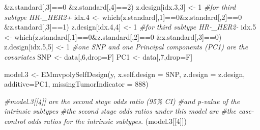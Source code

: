 \documentclass[11pt,]{article}
\newenvironment{Shaded}{\begin{snugshade}}{\end{snugshade}}
\newcommand{\AttributeTok}[1]{\textcolor[rgb]{0.77,0.63,0.00}{#1}}
\newcommand{\CommentTok}[1]{\textcolor[rgb]{0.56,0.35,0.01}{\textit{#1}}}
\newcommand{\DecValTok}[1]{\textcolor[rgb]{0.00,0.00,0.81}{#1}}
\newcommand{\FloatTok}[1]{\textcolor[rgb]{0.00,0.00,0.81}{#1}}
\newcommand{\FunctionTok}[1]{\textcolor[rgb]{0.00,0.00,0.00}{#1}}
\newcommand{\NormalTok}[1]{#1}
\newcommand{\OtherTok}[1]{\textcolor[rgb]{0.56,0.35,0.01}{#1}}
\newcommand{\SpecialCharTok}[1]{\textcolor[rgb]{0.00,0.00,0.00}{#1}}
\begin{document}
\begin{Shaded}
\begin{Highlighting}[]
               \SpecialCharTok{\&}\NormalTok{z.standard[,}\DecValTok{3}\NormalTok{]}\SpecialCharTok{==}\DecValTok{0}
               \SpecialCharTok{\&}\NormalTok{z.standard[,}\DecValTok{4}\NormalTok{]}\SpecialCharTok{==}\DecValTok{2}\NormalTok{)}
\NormalTok{z.design[idx}\FloatTok{.3}\NormalTok{,}\DecValTok{3}\NormalTok{] }\OtherTok{\textless{}{-}} \DecValTok{1}
\CommentTok{\#for third subtype HR{-}\_HER2+}
\NormalTok{idx}\FloatTok{.4} \OtherTok{\textless{}{-}} \FunctionTok{which}\NormalTok{(z.standard[,}\DecValTok{1}\NormalTok{]}\SpecialCharTok{==}\DecValTok{0}\SpecialCharTok{\&}\NormalTok{z.standard[,}\DecValTok{2}\NormalTok{]}\SpecialCharTok{==}\DecValTok{0}
               \SpecialCharTok{\&}\NormalTok{z.standard[,}\DecValTok{3}\NormalTok{]}\SpecialCharTok{==}\DecValTok{1}\NormalTok{)}
\NormalTok{z.design[idx}\FloatTok{.4}\NormalTok{,}\DecValTok{4}\NormalTok{] }\OtherTok{\textless{}{-}} \DecValTok{1}
\CommentTok{\#for third subtype HR{-}\_HER2{-}}
\NormalTok{idx}\FloatTok{.5} \OtherTok{\textless{}{-}} \FunctionTok{which}\NormalTok{(z.standard[,}\DecValTok{1}\NormalTok{]}\SpecialCharTok{==}\DecValTok{0}\SpecialCharTok{\&}\NormalTok{z.standard[,}\DecValTok{2}\NormalTok{]}\SpecialCharTok{==}\DecValTok{0}
               \SpecialCharTok{\&}\NormalTok{z.standard[,}\DecValTok{3}\NormalTok{]}\SpecialCharTok{==}\DecValTok{0}\NormalTok{)}
\NormalTok{z.design[idx}\FloatTok{.5}\NormalTok{,}\DecValTok{5}\NormalTok{] }\OtherTok{\textless{}{-}} \DecValTok{1}
\CommentTok{\#one SNP and one Principal components (PC1) are the covariates}
\NormalTok{SNP }\OtherTok{\textless{}{-}}\NormalTok{ data[,}\DecValTok{6}\NormalTok{,drop}\OtherTok{=}\NormalTok{F]}
\NormalTok{PC1 }\OtherTok{\textless{}{-}}\NormalTok{ data[,}\DecValTok{7}\NormalTok{,drop}\OtherTok{=}\NormalTok{F]}

\NormalTok{model}\FloatTok{.3} \OtherTok{\textless{}{-}} \FunctionTok{EMmvpolySelfDesign}\NormalTok{(y,}
          \AttributeTok{x.self.design =}\NormalTok{ SNP,}
    \AttributeTok{z.design =}\NormalTok{ z.design,}
    \AttributeTok{additive=}\NormalTok{PC1,}
  \AttributeTok{missingTumorIndicator =} \DecValTok{888}\NormalTok{)}
\end{Highlighting}
\end{Shaded}

\begin{Shaded}
\begin{Highlighting}[]
\CommentTok{\#model.3[[4]] are the second stage odds ratio (95\% CI) }
\CommentTok{\#and p{-}value of the intrinsic subtypes}
\CommentTok{\#the second stage odds ratios under this model are }
\CommentTok{\#the case{-}control odds ratios for the intrinsic subtypes.}
\NormalTok{(model}\FloatTok{.3}\NormalTok{[[}\DecValTok{4}\NormalTok{]])}
\end{Highlighting}
\end{Shaded}
\end{document}
